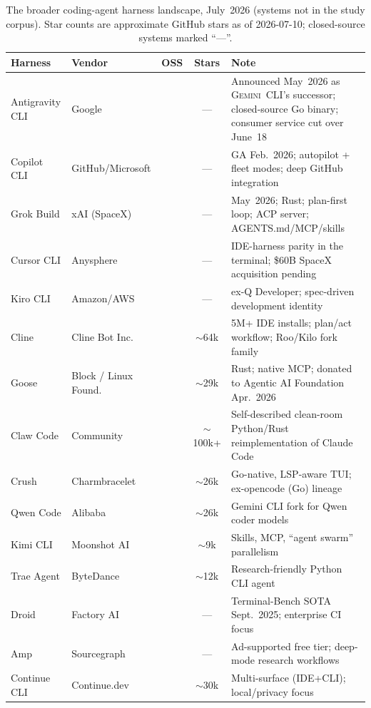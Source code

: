 \documentclass[11pt,a4paper]{article}
\newcommand{\gemini}{\textsc{Gemini~CLI}\xspace}
\newcommand{\cmark}{\ding{51}}
\newcommand{\xmark}{\ding{55}}
\begin{document}
\begin{table}[H]
\centering
\caption{The broader coding-agent harness landscape, July~2026 (systems not in the study corpus). Star counts are approximate GitHub stars as of 2026-07-10; closed-source systems marked ``---''.}
\label{tab:landscape}
\scriptsize
\renewcommand{\arraystretch}{1.15}
\begin{tabularx}{\textwidth}{@{}l l c c L{6.2cm}@{}}
\toprule
\textbf{Harness} & \textbf{Vendor} & \textbf{OSS} & \textbf{Stars} & \textbf{Note} \\
\midrule
Antigravity CLI & Google & \xmark & --- & Announced May~2026 as \gemini{}'s successor; closed-source Go binary; consumer service cut over June~18 \\
Copilot CLI & GitHub/Microsoft & \xmark & --- & GA Feb.~2026; autopilot + fleet modes; deep GitHub integration \\
Grok Build & xAI (SpaceX) & \xmark & --- & May~2026; Rust; plan-first loop; ACP server; AGENTS.md/MCP/skills \\
Cursor CLI & Anysphere & \xmark & --- & IDE-harness parity in the terminal; \$60B SpaceX acquisition pending \\
Kiro CLI & Amazon/AWS & \xmark & --- & ex-Q Developer; spec-driven development identity \\
Cline & Cline Bot Inc. & \cmark & $\sim$64k & 5M+ IDE installs; plan/act workflow; Roo/Kilo fork family \\
Goose & Block / Linux Found. & \cmark & $\sim$29k & Rust; native MCP; donated to Agentic AI Foundation Apr.~2026 \\
Claw Code & Community & \cmark & $\sim$100k+ & Self-described clean-room Python/Rust reimplementation of Claude Code \\
Crush & Charmbracelet & \cmark & $\sim$26k & Go-native, LSP-aware TUI; ex-opencode (Go) lineage \\
Qwen Code & Alibaba & \cmark & $\sim$26k & Gemini CLI fork for Qwen coder models \\
Kimi CLI & Moonshot AI & \cmark & $\sim$9k & Skills, MCP, ``agent swarm'' parallelism \\
Trae Agent & ByteDance & \cmark & $\sim$12k & Research-friendly Python CLI agent \\
Droid & Factory AI & \xmark & --- & Terminal-Bench SOTA Sept.~2025; enterprise CI focus \\
Amp & Sourcegraph & \xmark & --- & Ad-supported free tier; deep-mode research workflows \\
Continue CLI & Continue.dev & \cmark & $\sim$30k & Multi-surface (IDE+CLI); local/privacy focus \\
\bottomrule
\end{tabularx}
\end{table}
\end{document}
